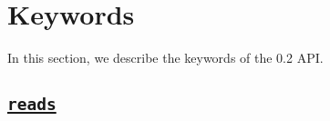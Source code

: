 



\clearpage
\section{Keywords}

In this section, we describe the keywords of the 0.2 API. 


\subsection{\underline{\texttt{reads}}}
\label{ssec:api_fe_reads}

